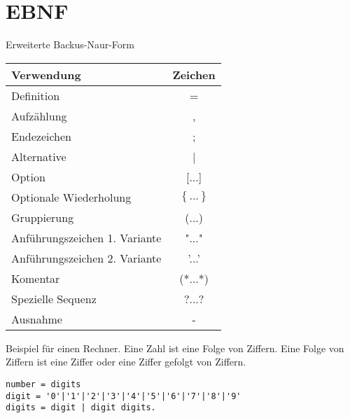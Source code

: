 \section{EBNF}
Erweiterte Backus-Naur-Form 
\begin{center}
	\begin{tabular}{|l|c|}
		\hline
\textbf{Verwendung} & \textbf{Zeichen} \\
\hline
Definition & =\\\hline
Aufzählung & ,\\\hline
Endezeichen & ;\\\hline
Alternative & |\\\hline
Option & [...]\\\hline
Optionale Wiederholung & $\left\lbrace ...\right\rbrace $ \\\hline
Gruppierung & (...)\\\hline
Anführungszeichen 1. Variante & "..."\\\hline
Anführungszeichen 2. Variante & '...'\\\hline
Komentar & (*...*)\\\hline
Spezielle Sequenz & ?...?\\\hline
Ausnahme & -\\
\hline
	\end{tabular}
\end{center}
Beispiel für einen Rechner.
Eine Zahl ist eine Folge von Ziffern. Eine Folge von Ziffern ist eine Ziffer oder eine Ziffer gefolgt von Ziffern.
\begin{lstlisting}[mathescape]
number = digits
digit = '0'|'1'|'2'|'3'|'4'|'5'|'6'|'7'|'8'|'9'
digits = digit | digit digits.

\end{lstlisting}
